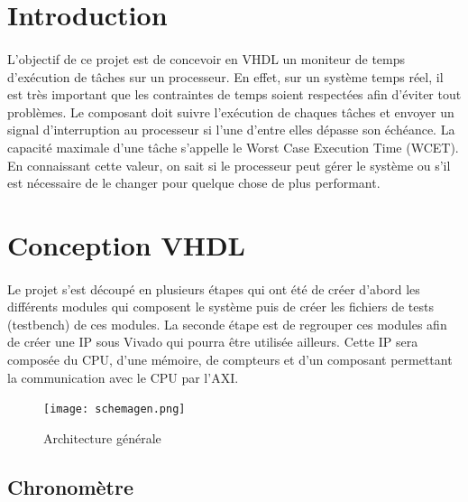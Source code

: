\documentclass[a4paper,12pt]{report}
\begin{document}
	\newpage\renewcommand{\contentsname}{Sommaire}
	\tableofcontents

	\newpage
	\section{Introduction}
		\paragraph*{}
		L'objectif de ce projet est de concevoir en VHDL un moniteur de temps d'exécution de tâches sur un processeur. En effet, sur un système temps réel, il est très important que les contraintes de temps soient respectées afin d'éviter tout problèmes. Le composant doit suivre l'exécution de chaques tâches et envoyer un signal d'interruption au processeur si l'une d'entre elles dépasse son échéance. La capacité maximale d'une tâche s'appelle le Worst Case Execution Time (WCET). En connaissant cette valeur, on sait si le processeur peut gérer le système ou s'il est nécessaire de le changer pour quelque chose de plus performant.
		
	\section{Conception VHDL}
		\paragraph*{}
		Le projet s'est découpé en plusieurs étapes qui ont été de créer d'abord les différents modules qui composent le système puis de créer les fichiers de tests (testbench) de ces modules.
		La seconde étape est de regrouper ces modules afin de créer une IP sous Vivado qui pourra être utilisée ailleurs.
		Cette IP sera composée du CPU, d'une mémoire, de compteurs et d'un composant permettant la communication avec le CPU par l'AXI.
		
		\begin{figure}[H]
			\centering
				\texttt{[image: schemagen.png]}
				\caption{Architecture générale}
			\label{archi}
		\end{figure}
		
		\subsection{Chronomètre}
\end{document}
